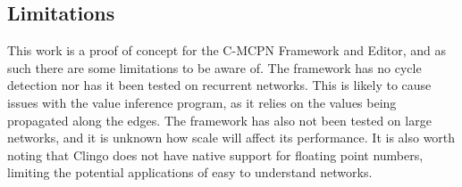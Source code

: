 \subsection{Limitations}
This work is a proof of concept for the C-MCPN Framework and Editor, and as such there are some limitations to be aware of. The framework has no cycle detection nor has it been tested on recurrent networks. This is likely to cause issues with the value inference program, as it relies on the values being propagated along the edges. The framework has also not been tested on large networks, and it is unknown how scale will affect its performance. It is also worth noting that Clingo does not have native support for floating point numbers, limiting the potential applications of easy to understand networks. 
